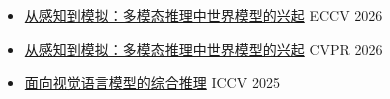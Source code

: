 \begin{itemize}
  \item \href{https://wangywust.github.io/eccv-tutorial-world-model/}{从感知到模拟：多模态推理中世界模型的兴起} \hfill ECCV 2026
  \item \href{https://wangywust.github.io/cvpr-tutorial-world-model/}{从感知到模拟：多模态推理中世界模型的兴起} \hfill CVPR 2026
  \item \href{https://wangywust.github.io/iccv-tutorial-reasoning-vlm/}{面向视觉语言模型的综合推理} \hfill ICCV 2025
\end{itemize}
